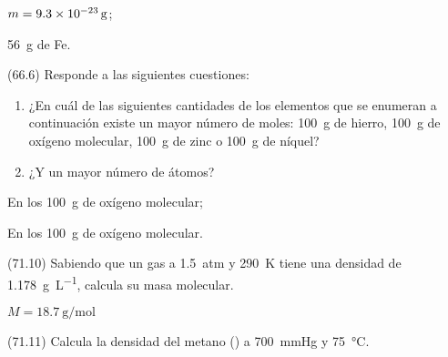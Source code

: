 \documentclass[10pt,a5paper,twoside]{article}
\begin{document}
    \begin{solution}
      \begin{enumerate*}
        \item \( m = \SI{9,3E-23}{\gram} \);
        \item \SI{56}{\gram} de Fe.
      \end{enumerate*}
    \end{solution}




    \begin{exercise}[
        tags    = {},
        topics  = {química,química básica},
        source  = {FQ 1B MGH 2016, p66, e6},
      ]
      (66.6) Responde a las siguientes cuestiones:
      \begin{enumerate}
        \item ¿En cuál de las siguientes cantidades de los elementos que se enumeran a continuación existe un mayor número de moles: \SI{100}{\gram} de hierro, \SI{100}{\gram} de oxígeno molecular, \SI{100}{\gram} de zinc o \SI{100}{\gram} de níquel?
        \item ¿Y un mayor número de átomos?
      \end{enumerate}
    \end{exercise}

    \begin{solution}
      \begin{enumerate*}
        \item En los \SI{100}{\gram} de oxígeno molecular;
        \item En los \SI{100}{\gram} de oxígeno molecular.
      \end{enumerate*}
    \end{solution}




    \begin{exercise}[
        tags    = {},
        topics  = {química,química básica},
        source  = {FQ 1B MGH 2016, p71, e10},
      ]
      (71.10) Sabiendo que un gas a \SI{1,5}{atm} y \SI{290}{\kelvin} tiene una densidad de \SI{1,178}{\gram\per\liter}, calcula su masa molecular.
    \end{exercise}

    \begin{solution}
      \( M = \SI{18,7}{\gram\per\mole} \)
    \end{solution}




    \begin{exercise}[
        tags    = {},
        topics  = {química,química básica},
        source  = {FQ 1B MGH 2016, p71, e11},
      ]
      (71.11) Calcula la densidad del metano () a \SI{700}{\mmHg} y \SI{75}{\celsius}.
    \end{exercise}
\end{document}

